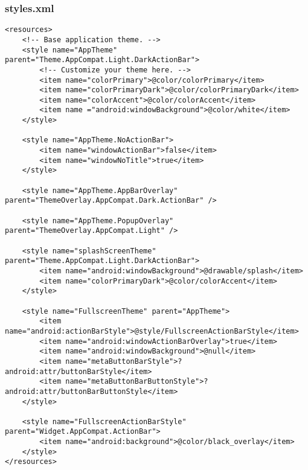 \subsubsection*{styles.xml}
\begin{lstlisting}
<resources>
    <!-- Base application theme. -->
    <style name="AppTheme" parent="Theme.AppCompat.Light.DarkActionBar">
        <!-- Customize your theme here. -->
        <item name="colorPrimary">@color/colorPrimary</item>
        <item name="colorPrimaryDark">@color/colorPrimaryDark</item>
        <item name="colorAccent">@color/colorAccent</item>
        <item name ="android:windowBackground">@color/white</item>
    </style>

    <style name="AppTheme.NoActionBar">
        <item name="windowActionBar">false</item>
        <item name="windowNoTitle">true</item>
    </style>

    <style name="AppTheme.AppBarOverlay" parent="ThemeOverlay.AppCompat.Dark.ActionBar" />

    <style name="AppTheme.PopupOverlay" parent="ThemeOverlay.AppCompat.Light" />

    <style name="splashScreenTheme" parent="Theme.AppCompat.Light.DarkActionBar">
        <item name="android:windowBackground">@drawable/splash</item>
        <item name="colorPrimaryDark">@color/colorAccent</item>
    </style>

    <style name="FullscreenTheme" parent="AppTheme">
        <item name="android:actionBarStyle">@style/FullscreenActionBarStyle</item>
        <item name="android:windowActionBarOverlay">true</item>
        <item name="android:windowBackground">@null</item>
        <item name="metaButtonBarStyle">?android:attr/buttonBarStyle</item>
        <item name="metaButtonBarButtonStyle">?android:attr/buttonBarButtonStyle</item>
    </style>

    <style name="FullscreenActionBarStyle" parent="Widget.AppCompat.ActionBar">
        <item name="android:background">@color/black_overlay</item>
    </style>
</resources>
\end{lstlisting}